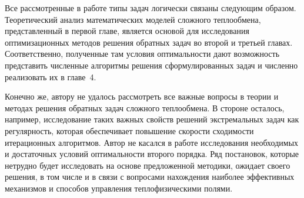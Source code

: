 Все рассмотренные в работе типы задач логически связаны следующим образом.
Теоретический анализ математических моделей сложного
теплообмена, представленный в первой главе, является основой для
исследования оптимизационных методов решения обратных задач во второй
и третьей главах.
Соответственно, полученные там условия оптимальности
дают возможность представить численные алгоритмы решения
сформулированных задач и численно реализовать их в главе~4.


Конечно же, автору не удалось рассмотреть все важные вопросы в теории и
методах решения обратных задач сложного теплообмена.
В стороне осталось, например, исследование таких важных свойств решений экстремальных
задач как регулярность, которая обеспечивает повышение скорости
сходимости итерационных алгоритмов.
Автор не касался в работе исследования необходимых и достаточных условий
оптимальности второго порядка.
Ряд постановок, которые нетрудно будет исследовать на основе
предложенной методики, ожидает своего решения, в том числе и в связи с
вопросами нахождения наиболее эффективных механизмов и способов
управления теплофизическими полями.
